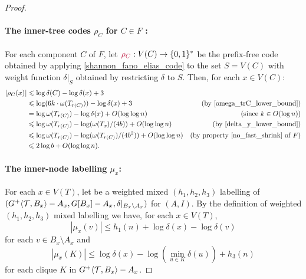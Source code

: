 \begin{proof}
  \paragraph{\boldmath The inner-tree codes $\rho_C$ for $C\in F$ :}
  For each component $C$ of $F$, let $\mathdefin{\rho_C}:V(C)\to\{0,1\}^*$ be the prefix-free code obtained by applying \cref{shannon_fano_elias_code} to the set $S=V(C)$ with weight function $\delta|_S$ obtained by restricting $\delta$ to $S$.  Then, for each $x\in V(C)$:
  \begin{align}
      |\rho_C(x)| 
      & \le \log \delta(C) - \log \delta(x) + 3 \label{rho_C_bound_defn} \\
      & \le \log (6k\cdot\omega(T_{r(C)})) - \log \delta(x) + 3 
        & \text{(by \eqref{omega_trC_lower_bound})} \nonumber \\
      & = \log\omega(T_{r(C)}) - \log\delta(x) + \Oh(\log\log n) 
        & \text{(since $k\in O(\log n)$)} \nonumber \\
      & \le \log\omega(T_{r(C)}) - \log(\omega(T_x)/(4b)) + \Oh(\log\log n) 
        & \text{(by \eqref{delta_y_lower_bound})} \nonumber \\
      & \le \log\omega(T_{r(C)}) - \log(\omega(T_{r(C)})/(4b^2)) + \Oh(\log\log n) 
        & \text{(by property~\ref{no_fast_shrink} of $F$)} \nonumber \\
      & \le 2\log b + \Oh(\log\log n)  .  \label{rho_C_bound_2logb}
  \end{align}

  \paragraph{\boldmath The inner-node labelling $\mu_x$:}  For each $x\in V(T)$, let  be a weighted mixed $(h_1,h_2,h_3)$ labelling of $({G^+}\langle{\mathcal{T},B_x}\rangle-A_x,G[B_x]-A_x,\delta|_{B_x\setminus A_x})$ for $(A,I)$.  By the definition of weighted $(h_1,h_2,h_3)$ mixed labelling we have, for each $x\in V(T)$, 
  \begin{equation}
    |\mu_x(v)|\le h_1(n) + \log\delta(x)-\log\delta(v) 
      \label{mu_x_v_upper_bound}
  \end{equation}
  for each $v\in B_x\setminus A_x$ and 
  \begin{equation}
    |\mu_x(K)|\le \log\delta(x)-\log(\min_{u\in K} \delta(u)) + h_3(n)
      \label{mu_x_K_upper_bound}
  \end{equation}
  for each clique $K$ in ${G^+}\langle{\mathcal{T},B_x}\rangle-A_x$.  
  

\end{proof}
